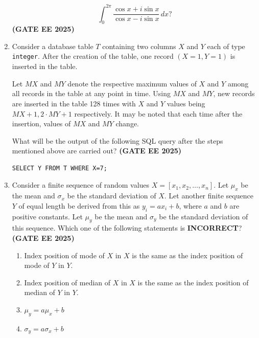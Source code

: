 \documentclass[journal,12pt,onecolumn]{IEEEtran}
\theoremstyle{remark}
\begin{document}
\begin{enumerate}
\[
\int_{0}^{2\pi} \frac{\cos x + i \sin x}{\cos x - i \sin x} \, dx ?
\]
\hfill \textbf{(GATE EE 2025)}
\begin{enumerate}
\end{enumerate}





\item Consider a database table $T$ containing two columns $X$ and $Y$ each of type \texttt{integer}. After the creation of the table, one record $(X=1, Y=1)$ is inserted in the table.  

Let $MX$ and $MY$ denote the respective maximum values of $X$ and $Y$ among all records in the table at any point in time. Using $MX$ and $MY$, new records are inserted in the table 128 times with $X$ and $Y$ values being $MX+1, 2 \cdot MY+1$ respectively. It may be noted that each time after the insertion, values of $MX$ and $MY$ change.  

What will be the output of the following SQL query after the steps mentioned above are carried out?  \hfill \textbf{(GATE EE 2025)}

\begin{verbatim}
SELECT Y FROM T WHERE X=7;
\end{verbatim}

\begin{enumerate}
\end{enumerate}




\item Consider a finite sequence of random values $X = [x_1, x_2, \ldots, x_n]$. Let $\mu_x$ be the mean and $\sigma_x$ be the standard deviation of $X$. Let another finite sequence $Y$ of equal length be derived from this as $y_i = a x_i + b$, where $a$ and $b$ are positive constants. Let $\mu_y$ be the mean and $\sigma_y$ be the standard deviation of this sequence. Which one of the following statements is \textbf{INCORRECT}?
\hfill \textbf{(GATE EE 2025)}
\begin{enumerate}
    \item Index position of mode of $X$ in $X$ is the same as the index position of mode of $Y$ in $Y$.
    \item Index position of median of $X$ in $X$ is the same as the index position of median of $Y$ in $Y$.
    \item $\mu_y = a \mu_x + b$
    \item $\sigma_y = a \sigma_x + b$
\end{enumerate}



\end{enumerate}
\end{document}
